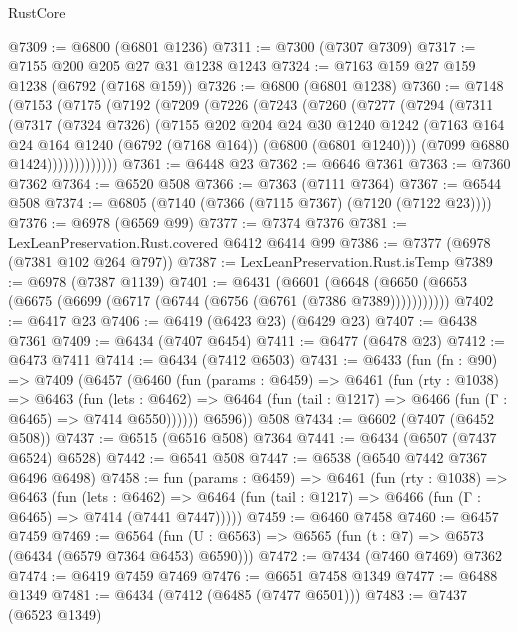 \begin{lexlean}{RustCore}
\begin{coremodule}
@7309 := @6800 (@6801 @1236)
@7311 := @7300 (@7307 @7309)
@7317 := @7155 @200 @205 @27 @31 @1238 @1243
@7324 := @7163 @159 @27 @159 @1238 (@6792 (@7168 @159))
@7326 := @6800 (@6801 @1238)
@7360 := @7148
    (@7153
      (@7175
        (@7192
          (@7209
            (@7226
              (@7243
                (@7260
                  (@7277
                    (@7294
                      (@7311
                        (@7317
                          (@7324 @7326)
                          (@7155
                            @202
                            @204
                            @24
                            @30
                            @1240
                            @1242
                            (@7163 @164 @24 @164 @1240 (@6792 (@7168 @164)) (@6800 (@6801 @1240)))
                            (@7099 @6880 @1424)))))))))))))
@7361 := @6448 @23
@7362 := @6646 @7361
@7363 := @7360 @7362
@7364 := @6520 @508
@7366 := @7363 (@7111 @7364)
@7367 := @6544 @508
@7374 := @6805 (@7140 (@7366 (@7115 @7367) (@7120 (@7122 @23))))
@7376 := @6978 (@6569 @99)
@7377 := @7374 @7376
@7381 := LexLeanPreservation.Rust.covered @6412 @6414 @99
@7386 := @7377 (@6978 (@7381 @102 @264 @797))
@7387 := LexLeanPreservation.Rust.isTemp
@7389 := @6978 (@7387 @1139)
@7401 := @6431
    (@6601 (@6648 (@6650 (@6653 (@6675 (@6699 (@6717 (@6744 (@6756 (@6761 (@7386 @7389)))))))))))
@7402 := @6417 @23
@7406 := @6419 (@6423 @23) (@6429 @23)
@7407 := @6438 @7361
@7409 := @6434 (@7407 @6454)
@7411 := @6477 (@6478 @23)
@7412 := @6473 @7411
@7414 := @6434 (@7412 @6503)
@7431 := @6433
    (fun (fn : @90) =>
    @7409
      (@6457
        (@6460
          (fun (params : @6459) =>
          @6461
            (fun (rty : @1038) =>
            @6463
              (fun (lets : @6462) =>
              @6464 (fun (tail : @1217) => @6466 (fun (Γ : @6465) => @7414 @6550))))))
        @6596))
    @508
@7434 := @6602 (@7407 (@6452 @508))
@7437 := @6515 (@6516 @508) @7364
@7441 := @6434 (@6507 (@7437 @6524) @6528)
@7442 := @6541 @508
@7447 := @6538 (@6540 @7442 @7367 @6496 @6498)
@7458 := fun (params : @6459) =>
  @6461
    (fun (rty : @1038) =>
    @6463
      (fun (lets : @6462) =>
      @6464 (fun (tail : @1217) => @6466 (fun (Γ : @6465) => @7414 (@7441 @7447)))))
@7459 := @6460 @7458
@7460 := @6457 @7459
@7469 := @6564 (fun (U : @6563) => @6565 (fun (t : @7) => @6573 (@6434 (@6579 @7364 @6453) @6590)))
@7472 := @7434 (@7460 @7469) @7362
@7474 := @6419 @7459 @7469
@7476 := @6651 @7458 @1349
@7477 := @6488 @1349
@7481 := @6434 (@7412 (@6485 (@7477 @6501)))
@7483 := @7437 (@6523 @1349)

\end{coremodule}
\end{lexlean}
